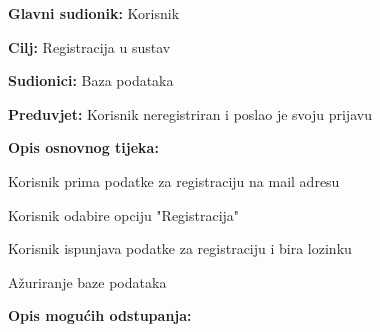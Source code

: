 					\noindent {}
					\begin{packed_item}
						
						\item \textbf{Glavni sudionik: }Korisnik
						\item  \textbf{Cilj:} Registracija u sustav
						\item  \textbf{Sudionici:} Baza podataka
						\item  \textbf{Preduvjet:} Korisnik neregistriran i poslao je svoju prijavu
						\item  \textbf{Opis osnovnog tijeka:}
						
						\item[] \begin{packed_enum}
							
							\item Korisnik prima podatke za registraciju na mail adresu
							\item Korisnik odabire opciju "Registracija"
							\item Korisnik ispunjava podatke za registraciju i bira lozinku
							\item Ažuriranje baze podataka
						\end{packed_enum}
						
						\item  \textbf{Opis mogućih odstupanja:}
							
					\end{packed_item}
				

